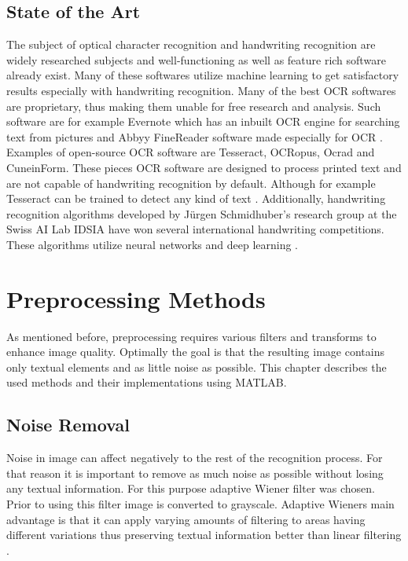 \documentclass{article}
\begin{document}
    \subsection{State of the Art}
      The subject of optical character recognition and handwriting recognition are widely researched subjects and well-functioning as well as feature rich software already exist. Many of these softwares utilize machine learning to get satisfactory results especially with handwriting recognition. Many of the best OCR softwares are proprietary, thus making them unable for free research and analysis. Such software are for example Evernote which has an inbuilt OCR engine for searching text from pictures \cite{Kelly} and Abbyy FineReader software made especially for OCR \cite{ABBYY}. Examples of open-source OCR software are Tesseract\cite{Smith2007a}, OCRopus\cite{Breuel2007}, Ocrad\cite{FreeSoftwareFoundation2016} and CuneinForm\cite{CognitiveTechnologies2016}. These pieces OCR software are designed to process printed text and are not capable of handwriting recognition by default. Although for example Tesseract can be trained to detect any kind of text \cite{Smith2007a}. Additionally, handwriting recognition algorithms developed by J{\"u}rgen Schmidhuber's research group at the Swiss AI Lab IDSIA have won several international handwriting competitions. These algorithms utilize neural networks and deep learning \cite{Angelica}.

  \newpage
  \section{Preprocessing Methods}
  As mentioned before, preprocessing requires various filters and transforms to enhance image quality. Optimally the goal is that the resulting image contains only textual elements and as little noise as possible. This chapter describes the used methods and their implementations using MATLAB.

        \subsection{Noise Removal}
          Noise in image can affect negatively to the rest of the recognition process. For that reason it is important to remove as much noise as possible without losing any textual information. For this purpose adaptive Wiener filter was chosen. Prior to using this filter image is converted to grayscale. Adaptive Wieners main advantage is that it can apply varying amounts of filtering to areas having different variations thus preserving textual information better than linear filtering \cite{TheMathWorksWiener}.
\end{document}
